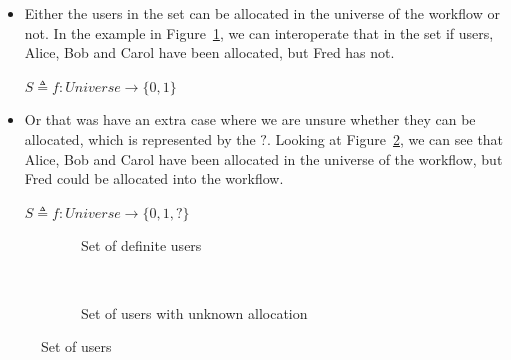 \documentclass[a4paper]{report}
\begin{document}
\begin{itemize}
\item Either the users in the set can be allocated in the universe of the workflow or not. In the example in Figure~\ref{fig:Set of definite users}, we can interoperate that in the set if users, Alice, Bob and Carol have been allocated, but Fred has not.
\begin{center}
$ S \triangleq f : Universe \longrightarrow \{0, 1\}$
\end{center}
\item Or that was have an extra case where we are unsure whether they can be allocated, which is represented by the $?$. Looking at Figure~\ref{fig:Set of users with unknown allocation}, we can see that Alice, Bob and Carol have been allocated in the universe of the workflow, but Fred could be allocated into the workflow. 
\begin{center}
$ S \triangleq f : Universe \longrightarrow \{0, 1, ?\}$
\end{center}
\end{itemize}

\begin{figure}[!h]
\centering
\begin{subfigure}[b]{\textwidth}
\centering
{}
\caption{Set of definite users}
\label{fig:Set of definite users}
\end{subfigure} \\
\begin{subfigure}[b]{\textwidth}
\centering
{}
\caption{Set of users with unknown allocation}
\label{fig:Set of users with unknown allocation}
\end{subfigure}
\caption{Set of users}
\label{fig:Set of Users}
\end{figure}
\end{document}
